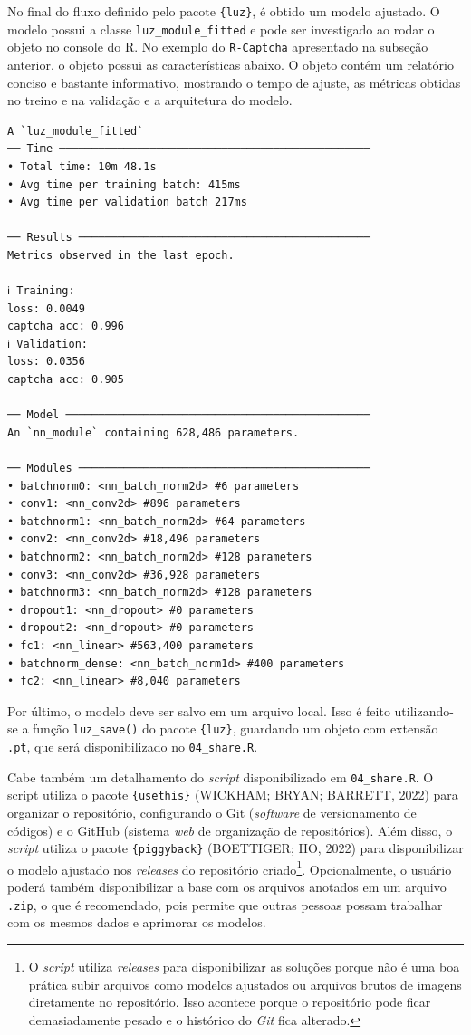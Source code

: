 \documentclass[12pt,twoside,brazilian]{book}
\begin{document}
No final do fluxo definido pelo pacote \texttt{\{luz\}}, é obtido um
modelo ajustado. O modelo possui a classe \texttt{luz\_module\_fitted} e
pode ser investigado ao rodar o objeto no console do R. No exemplo do
\texttt{R-Captcha} apresentado na subseção anterior, o objeto possui as
características abaixo. O objeto contém um relatório conciso e bastante
informativo, mostrando o tempo de ajuste, as métricas obtidas no treino
e na validação e a arquitetura do modelo.

\begin{verbatim}
A `luz_module_fitted`
── Time ────────────────────────────────────────────────
• Total time: 10m 48.1s
• Avg time per training batch: 415ms
• Avg time per validation batch 217ms

── Results ─────────────────────────────────────────────
Metrics observed in the last epoch.

ℹ Training:
loss: 0.0049
captcha acc: 0.996
ℹ Validation:
loss: 0.0356
captcha acc: 0.905

── Model ───────────────────────────────────────────────
An `nn_module` containing 628,486 parameters.

── Modules ─────────────────────────────────────────────
• batchnorm0: <nn_batch_norm2d> #6 parameters
• conv1: <nn_conv2d> #896 parameters
• batchnorm1: <nn_batch_norm2d> #64 parameters
• conv2: <nn_conv2d> #18,496 parameters
• batchnorm2: <nn_batch_norm2d> #128 parameters
• conv3: <nn_conv2d> #36,928 parameters
• batchnorm3: <nn_batch_norm2d> #128 parameters
• dropout1: <nn_dropout> #0 parameters
• dropout2: <nn_dropout> #0 parameters
• fc1: <nn_linear> #563,400 parameters
• batchnorm_dense: <nn_batch_norm1d> #400 parameters
• fc2: <nn_linear> #8,040 parameters
\end{verbatim}

Por último, o modelo deve ser salvo em um arquivo local. Isso é feito
utilizando-se a função \texttt{luz\_save()} do pacote \texttt{\{luz\}},
guardando um objeto com extensão \texttt{.pt}, que será disponibilizado
no \texttt{04\_share.R}.

Cabe também um detalhamento do \emph{script} disponibilizado em
\texttt{04\_share.R}. O script utiliza o pacote \texttt{\{usethis\}}
(WICKHAM; BRYAN; BARRETT, 2022) para organizar o repositório,
configurando o Git (\emph{software} de versionamento de códigos) e o
GitHub (sistema \emph{web} de organização de repositórios). Além disso,
o \emph{script} utiliza o pacote \texttt{\{piggyback\}} (BOETTIGER; HO,
2022) para disponibilizar o modelo ajustado nos \emph{releases} do
repositório criado\footnote{O \emph{script} utiliza \emph{releases} para
  disponibilizar as soluções porque não é uma boa prática subir arquivos
  como modelos ajustados ou arquivos brutos de imagens diretamente no
  repositório. Isso acontece porque o repositório pode ficar
  demasiadamente pesado e o histórico do \emph{Git} fica alterado.}.
Opcionalmente, o usuário poderá também disponibilizar a base com os
arquivos anotados em um arquivo \texttt{.zip}, o que é recomendado, pois
permite que outras pessoas possam trabalhar com os mesmos dados e
aprimorar os modelos.
\end{document}
